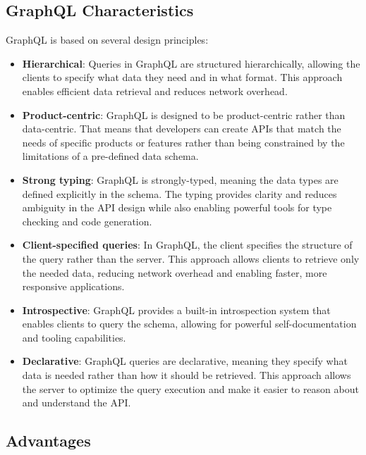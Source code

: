 \subsection{GraphQL Characteristics}\label{subsection:background:graphql:graphql-characteristics}

GraphQL is based on several design principles: \cite{misc:-:background:graphql:graphql-specification}

\begin{itemize}
    \item \textbf{Hierarchical}: Queries in GraphQL are structured hierarchically, allowing the clients to specify what data they need and in what format. This approach enables efficient data retrieval and reduces network overhead.

    \item \textbf{Product-centric}: GraphQL is designed to be product-centric rather than data-centric. That means that developers can create APIs that match the needs of specific products or features rather than being constrained by the limitations of a pre-defined data schema.

    \item \textbf{Strong typing}: GraphQL is strongly-typed, meaning the data types are defined explicitly in the schema. The typing provides clarity and reduces ambiguity in the API design while also enabling powerful tools for type checking and code generation.

    \item \textbf{Client-specified queries}: In GraphQL, the client specifies the structure of the query rather than the server. This approach allows clients to retrieve only the needed data, reducing network overhead and enabling faster, more responsive applications.

    \item \textbf{Introspective}: GraphQL provides a built-in introspection system that enables clients to query the schema, allowing for powerful self-documentation and tooling capabilities.

    \item \textbf{Declarative}: GraphQL queries are declarative, meaning they specify what data is needed rather than how it should be retrieved. This approach allows the server to optimize the query execution and make it easier to reason about and understand the API.
\end{itemize}

\subsection{Advantages}\label{subsection:background:graphql:graphql-advantages}

